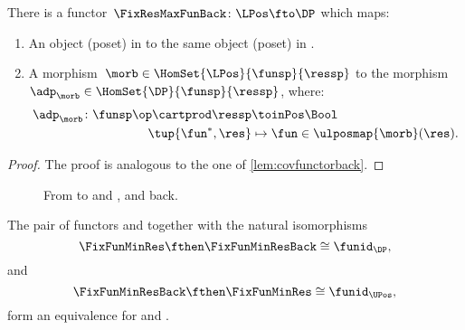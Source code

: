 \begin{lemma}
    \label{lem:cofunctorback}
    There is a functor~$\FixResMaxFunBack\colon \LPos \fto \DP$ which maps:
    \begin{enumerate}
        \item An object (poset) in \UPos to the same object (poset) in \DP.
        \item A morphism~$\morb\in \HomSet{\LPos}{\funsp}{\ressp}$ to the morphism~$\adp_\morb \in \HomSet{\DP}{\funsp}{\ressp}$, where:
              \begin{equation}
                  \begin{aligned}
                      \adp_\morb\colon \funsp\op \cartprod \ressp & \toinPos \Bool                           \\
                      \tup{\fun^*,\res}                           & \mapsto \fun \in \ulposmap{\morb}(\res).
                  \end{aligned}
              \end{equation}
    \end{enumerate}
\end{lemma}

\begin{proof}
    The proof is analogous to the one of \cref{lem:covfunctorback}.
\end{proof}

\begin{figure}[tbh]
    \centering
    \caption{From \DP to \UPos and \LPos, and back.}
\end{figure}


\begin{lemma}
    The pair of functors \FixFunMinRes and \FixFunMinResBack together with the natural isomorphisms
    \begin{equation*}
        \FixFunMinRes \fthen \FixFunMinResBack \cong \funid_\DP,
    \end{equation*}
    and
    \begin{equation*}
        \FixFunMinResBack \fthen \FixFunMinRes \cong \funid_\UPos,
    \end{equation*}
    form an equivalence for \DP and \UPos.
\end{lemma}

